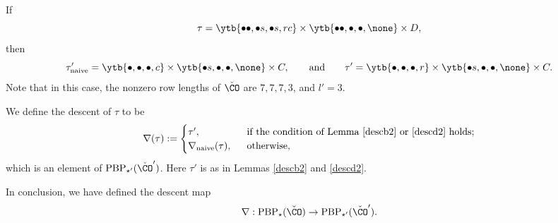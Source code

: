 \documentclass[ssunip]{subfiles}
\begin{document}
\begin{Example}
 If 
 \[
 \tau= \ytb{\bullet\bullet, \bullet s, \bullet s, r c} \times \ytb{\bullet\bullet,\bullet,\bullet, \none }\times 
  D,
 \]
 then 
\[
 \tau'_{\mathrm{naive}}=\ytb{\bullet, \bullet , \bullet ,  c} \times \ytb{\bullet s,\bullet,\bullet, \none } \times 
  C,\qquad\textrm{and}\qquad \tau'=\ytb{\bullet, \bullet , \bullet ,  r} \times \ytb{\bullet s,\bullet,\bullet, \none } \times
  C.
 \]
 Note that in this case, the nonzero row lengths of $\check \CO$ are $7,7,7,3$,   and $l'=3$.
\end{Example}

\begin{defn}
We define the descent of $\tau$ to be 
\[
  \nabla(\tau):= \begin{cases}
  \tau', & \ \text{ if the condition of Lemma \ref{descb2}  or \ref{descd2} holds}; \\
  \nabla_{\mathrm{naive}}( \tau), & \ \text{ otherwise},
\end{cases}
\]
which is an element of $  \mathrm{PBP}_{\star'}(\check \CO')$. 
Here $\tau'$ is as in Lemmas  \ref{descb2} and \ref{descd2}. 
\end{defn}
In conclusion, we have defined the descent map
\[
\nabla: \mathrm{PBP}_{\star}(\check \CO)\rightarrow \mathrm{PBP}_{\star'}(\check \CO').
\]
\end{document}
